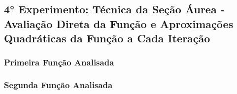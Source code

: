 \subsection{4° Experimento: Técnica da Seção Áurea - Avaliação Direta da Função e Aproximações Quadráticas da Função a Cada Iteração}
    \subsubsection{Primeira Função Analisada}
    \subsubsection{Segunda Função Analisada}

\newpage